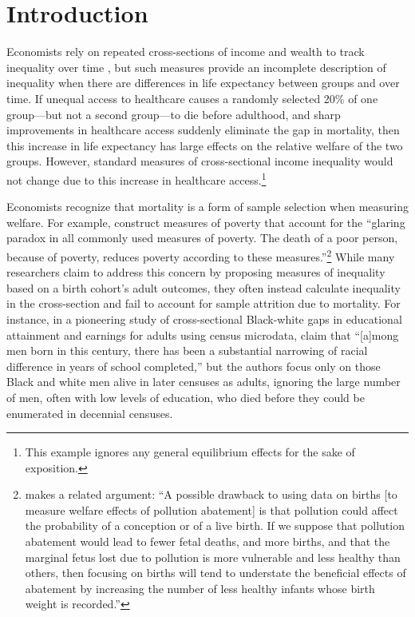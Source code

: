 \documentclass[12pt]{article}
\begin{document}
\section{Introduction}


Economists rely on repeated cross-sections of income and wealth to track inequality over time , but such measures provide an incomplete description of inequality when there are differences in life expectancy between groups and over time. 
If unequal access to healthcare causes a randomly selected 20\% of one group---but not a second group---to die before adulthood, and sharp improvements in healthcare access suddenly eliminate the gap in mortality, then this increase in life expectancy has large effects on the relative welfare of the two groups. 
However, standard measures of cross-sectional income inequality would not change due to this increase in healthcare access.\footnote{This example ignores any general equilibrium effects for the sake of exposition.}

Economists recognize that mortality is a form of sample selection when measuring welfare. 
For example,  construct measures of poverty that account for the ``glaring paradox in all commonly used measures of poverty. 
The death of a poor person, because of poverty, reduces poverty according to these measures.''\footnote{ makes a related argument: ``A possible drawback to using data on births [to measure welfare effects of pollution abatement] is that pollution could affect the probability of a conception or of a live birth. If we suppose that pollution abatement would lead to fewer fetal deaths, and more births, and that the marginal fetus lost due to pollution is more vulnerable and less healthy than others, then focusing on births will tend to understate the beneficial effects of abatement by increasing the number of less healthy infants whose birth weight is recorded.''} 
While many researchers claim to address this concern by proposing measures of inequality based on a birth cohort's adult outcomes, they often instead calculate inequality in the cross-section and fail to account for sample attrition due to mortality. 
For instance, in a pioneering study of cross-sectional Black-white gaps in educational attainment and earnings for adults using census microdata,  claim that ``[a]mong men born in this century, there has been a substantial narrowing of racial difference in years of school completed,'' but the authors focus only on those Black and white men alive in later censuses as adults, ignoring the large number of men, often with low levels of education, who died before they could be enumerated in decennial censuses.
\end{document}

